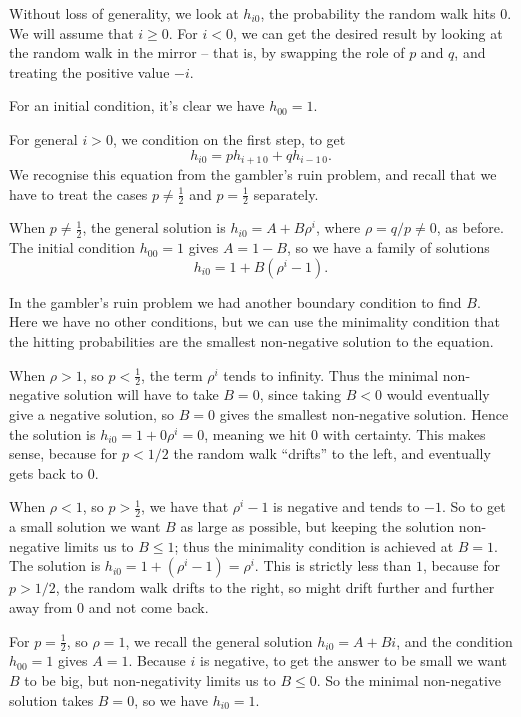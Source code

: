 \documentclass[
  a4paper,
]{article}
\theoremstyle{definition}
\theoremstyle{definition}
\theoremstyle{definition}
\theoremstyle{remark}
\begin{document}
Without loss of generality, we look at \(h_{i0}\), the probability the random walk hits \(0\).
We will assume that \(i \geq 0\). For \(i < 0\), we can get the desired result by looking at the random walk in the mirror -- that is, by swapping the role of \(p\) and \(q\), and treating the positive value \(-i\).

For an initial condition, it's clear we have \(h_{00} = 1\).

For general \(i > 0\), we condition on the first step, to get
\[ h_{i0} = ph_{i+1\, 0} + qh_{i-1\, 0} .  \]
We recognise this equation from the gambler's ruin problem, and recall that we have to treat the cases \(p \neq \frac12\) and \(p = \frac12\) separately.

When \(p \neq \frac12\), the general solution is \(h_{i0} = A + B\rho^i\), where \(\rho = q/p \neq 0\), as before. The initial condition \(h_{00} = 1\) gives \(A = 1-B\), so we have a family of solutions
\[ h_{i0} = 1 + B(\rho^i - 1) . \]

In the gambler's ruin problem we had another boundary condition to find \(B\). Here we have no other conditions, but we can use the minimality condition that the hitting probabilities are the smallest non-negative solution to the equation.

When \(\rho > 1\), so \(p < \frac12\), the term \(\rho^i\) tends to infinity. Thus the minimal non-negative solution will have to take \(B = 0\), since taking \(B < 0\) would eventually give a negative solution, so \(B = 0\) gives the smallest non-negative solution. Hence the solution is \(h_{i0} = 1 + 0\rho^i = 0\), meaning we hit \(0\) with certainty. This makes sense, because for \(p < 1/2\) the random walk ``drifts'' to the left, and eventually gets back to \(0\).

When \(\rho < 1\), so \(p > \frac12\), we have that \(\rho^i - 1\) is negative and tends to \(-1\). So to get a small solution we want \(B\) as large as possible, but keeping the solution non-negative limits us to \(B \leq 1\); thus the minimality condition is achieved at \(B = 1\). The solution is \(h_{i0} = 1 + (\rho^i - 1) = \rho^i\). This is strictly less than \(1\), because for \(p > 1/2\), the random walk drifts to the right, so might drift further and further away from \(0\) and not come back.

For \(p = \frac12\), so \(\rho = 1\), we recall the general solution \(h_{i0} = A + Bi\), and the condition \(h_{00} = 1\) gives \(A = 1\). Because \(i\) is negative, to get the answer to be small we want \(B\) to be big, but non-negativity limits us to \(B \leq 0\). So the minimal non-negative solution takes \(B = 0\), so we have \(h_{i0} = 1\).
\end{document}
